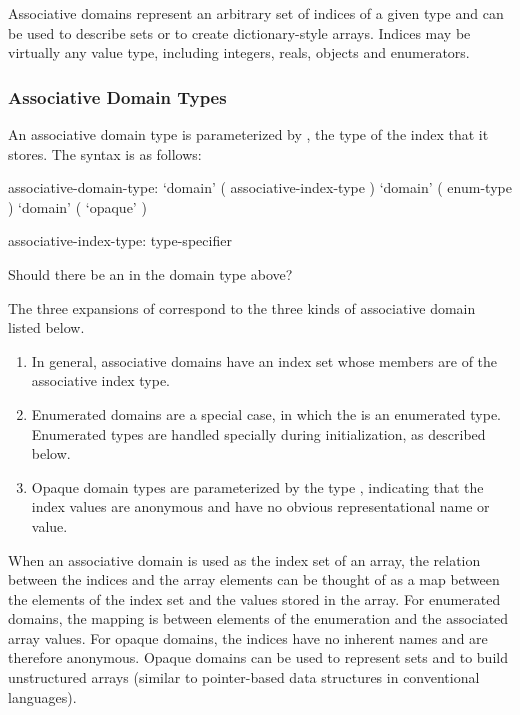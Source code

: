 Associative domains represent an arbitrary set of indices
of a given type and can be used to describe sets or to create
dictionary-style arrays.  Indices may be virtually any value type, including
integers, reals, objects and enumerators.

\subsubsection{Associative Domain Types}

\label{Associative_Domain_Types}

An associative domain type is parameterized by , the
type of the index that it stores.  The syntax is as follows:

\begin{syntax}
associative-domain-type:
  `domain' ( associative-index-type )
  `domain' ( enum-type )
  `domain' ( `opaque' )

associative-index-type:
  type-specifier
\end{syntax}

\begin{openissue}
Should there be an  in the domain type above?
\end{openissue}

The three expansions of  correspond to the three
kinds of associative domain listed below.
\begin{enumerate} 
\item In general, associative domains have an index set whose members are of the
associative index type.  
\item Enumerated domains are a special case, in which
the  is an enumerated type.  Enumerated types are
handled specially during initialization, as described below.
\item Opaque domain types are parameterized by the type ,
indicating that the index values are anonymous and have no obvious
representational name or value.  
\end{enumerate}

When an associative domain is used as the index set of an array, the relation
between the indices and the array elements can be thought of as a map between
the elements of the index set and the values stored in the array.
For enumerated domains, the mapping is between elements of the enumeration and
the associated array values.  For opaque domains, the
indices have no inherent names and are therefore anonymous.  Opaque domains can
be used to represent sets and to build unstructured arrays (similar to
pointer-based data structures in conventional languages).

